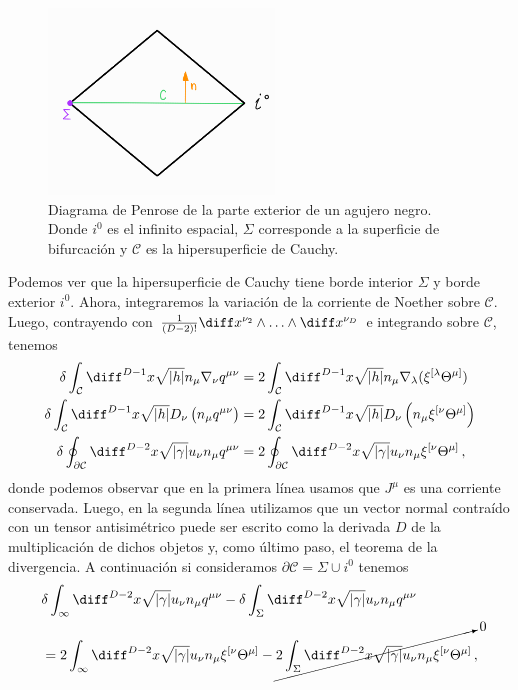 \documentclass[../Main.tex]{subfiles}
\begin{document}
\begin{figure}[H]
\includegraphics[width=6cm]{Capitulos/imagenes/fig1.png}
\centering
\caption{Diagrama de Penrose de la parte exterior de un agujero negro. Donde $i^{0}$ es el infinito espacial, $\Sigma$ corresponde a la superficie de bifurcación y $\mathcal{C}$ es la hipersuperficie de Cauchy.}
\end{figure}
Podemos ver que la hipersuperficie de Cauchy tiene borde interior $\Sigma$ y borde exterior $i^{0}$. Ahora, integraremos la variación de la corriente de Noether sobre $\mathcal{C}$. Luego, contrayendo con $\frac{1}{(D-2) !} \diff x^{\nu_2} \wedge \ldots \wedge \diff x^{\nu_D} $ e integrando sobre $\mathcal{C}$, tenemos 
\begin{align}\notag
\delta \int_\mathcal{C} \diff^{D-1} x \sqrt{|h|}n_\mu {\nabla_\nu q^{\mu \nu}}&=2 \int_\mathcal{C} \diff^{D-1} x \sqrt{|h|}n_\mu \nabla_\lambda(\xi^{[\lambda} \Theta^{\mu]})\\ \notag
\delta \int_\mathcal{C}\diff^{D-1}x \sqrt{|h|} D_\nu\left(n_\mu q^{\mu \nu}\right)&=2 \int_\mathcal{C} \diff^{D-1}x\sqrt{|h|} D_\nu\left(n_\mu \xi^{[\nu} \Theta^{\mu]}\right)\\ 
\delta \oint_{\partial\mathcal{C}} \diff^{D-2}x \sqrt{|\gamma|} u_\nu n_\mu q^{\mu \nu}&=2 \oint_{\partial \mathcal{C}} \diff ^{D-2}x \sqrt{|\gamma|} u_\nu n_\mu \xi^{[\nu} \Theta^{\mu]}\, ,
\end{align}
donde podemos observar que en la primera línea usamos que $J^{\mu}$ es una corriente conservada. Luego, en la segunda línea utilizamos que un vector normal contraído con un tensor antisimétrico puede ser escrito como la derivada $D$ de la multiplicación de dichos objetos y, como último paso, el teorema de la divergencia. A continuación si consideramos $\partial\mathcal{C}=\Sigma\cup i^{0}$ tenemos 
\begin{align}\notag
&\delta \int_{\infty} \diff^{D-2}x\sqrt{|\gamma|} u_\nu n_\mu q^{\mu \nu}-\delta \int_{\Sigma} \diff^{D-2}x\sqrt{|\gamma|} u_\nu n_\mu q^{\mu\nu}\\
&=2 \int_{\infty} \diff^{D-2}x\sqrt{|\gamma|} u_\nu n_\mu \xi^{[\nu} \Theta^{\mu]}-\cancelto{0}{{2 \int_{\Sigma} \diff^{D-2}x\sqrt{|\gamma|} u_\nu n_\mu \xi^{[\nu} \Theta^{\mu]}}} \, ,
\end{align}
\end{document}

